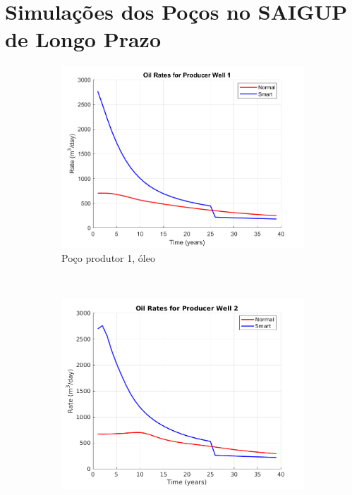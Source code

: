 \chapter{Simula\c{c}\~{o}es dos Po\c{c}os no SAIGUP de Longo Prazo}\label{apn:lSAIGUP}

\begin{figure}[!ht]
	\centering
	\begin{subfigure}[b]{.3\textwidth}
		\includegraphics[width=\textwidth]{figs/resultadosLSAIGUP/LSAIGUP_OilWell1_Zoom}
		\caption{Po\c{c}o produtor 1, \'{o}leo}
		\label{LSAIGUP_OilWell1}
	\end{subfigure}
	~
	\begin{subfigure}[b]{.3\textwidth}
		\includegraphics[width=\textwidth]{figs/resultadosLSAIGUP/LSAIGUP_OilWell2_Zoom}

\end{subfigure}
\end{figure}
